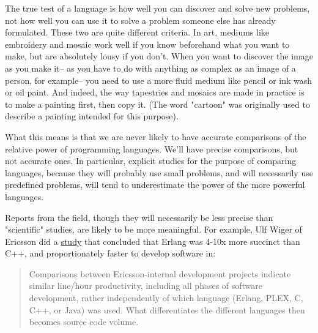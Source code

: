 The true test of a language is how
                  well you can discover and solve new problems, not how well you
                  can use it to solve a problem someone else has already
                  formulated. These two are quite different criteria. In art,
                  mediums like embroidery and mosaic work well if you know
                  beforehand what you want to make, but are absolutely lousy if
                  you don't. When you want to discover the image as you make
                  it-- as you have to do with anything as complex as an image of
                  a person, for example-- you need to use a more fluid medium
                  like pencil or ink wash or oil paint. And indeed, the way
                  tapestries and mosaics are made in practice is to make a
                  painting first, then copy it. (The word "cartoon" was
                  originally used to describe a painting intended for this
                  purpose).

What this means is that we are never
                  likely to have accurate comparisons of the relative power of
                  programming languages. We'll have precise comparisons, but not
                  accurate ones. In particular, explicit studies for the purpose
                  of comparing languages, because they will probably use small
                  problems, and will necessarily use predefined problems, will
                  tend to underestimate the power of the more powerful
                  languages.

Reports from the field, though they will
                  necessarily be less precise than "scientific" studies, are
                  likely to be more meaningful. For example, Ulf Wiger of
                  Ericsson did a
                  \href{http://www.erlang.se/publications/Ulf\_Wiger.pdf}{study}
                  that concluded that Erlang was 4-10x more succinct than C++,
                  and proportionately faster to develop software in:
                  \begin{quote}

                    Comparisons between Ericsson-internal development projects
                    indicate similar line/hour productivity, including all
                    phases of software development, rather independently of
                    which language (Erlang, PLEX, C, C++, or Java) was used.
                    What differentiates the different languages then becomes
                    source code volume.
                  
\end{quote}


